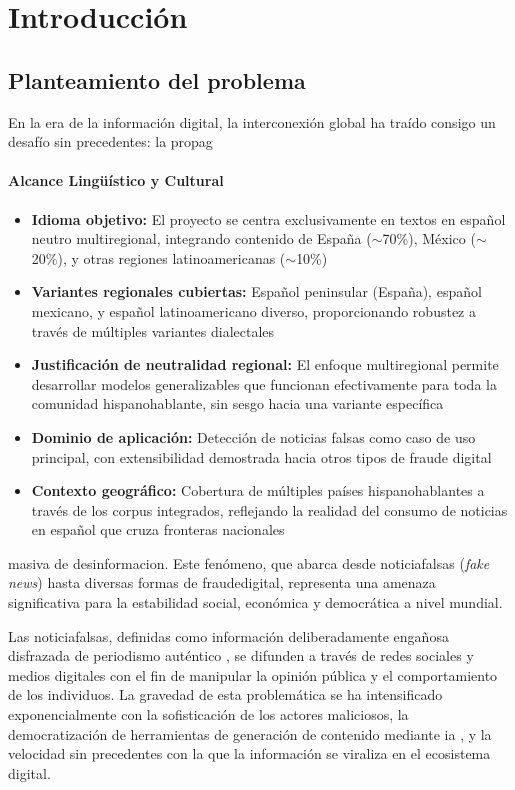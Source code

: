 \chapter{Introducción \label{cap:Introduccion}}

\section{Planteamiento del problema}

En la era de la información digital, la interconexión global ha traído consigo un desafío sin precedentes: la propag\subsubsection{Alcance Lingüístico y Cultural}
\begin{itemize}
    \item \textbf{Idioma objetivo:} El proyecto se centra exclusivamente en textos en español neutro multiregional, integrando contenido de España ($\sim$70\%), México ($\sim$20\%), y otras regiones latinoamericanas ($\sim$10\%)
    \item \textbf{Variantes regionales cubiertas:} Español peninsular (España), español mexicano, y español latinoamericano diverso, proporcionando robustez a través de múltiples variantes dialectales
    \item \textbf{Justificación de neutralidad regional:} El enfoque multiregional permite desarrollar modelos generalizables que funcionan efectivamente para toda la comunidad hispanohablante, sin sesgo hacia una variante específica
    \item \textbf{Dominio de aplicación:} Detección de noticias falsas como caso de uso principal, con extensibilidad demostrada hacia otros tipos de fraude digital
    \item \textbf{Contexto geográfico:} Cobertura de múltiples países hispanohablantes a través de los corpus integrados, reflejando la realidad del consumo de noticias en español que cruza fronteras nacionales
\end{itemize}masiva de \gls{desinformacion}. Este fenómeno, que abarca desde \glspl{noticiafalsa} (\textit{fake news}) hasta diversas formas de \gls{fraudedigital}, representa una amenaza significativa para la estabilidad social, económica y democrática a nivel mundial.

Las \glspl{noticiafalsa}, definidas como información deliberadamente engañosa disfrazada de periodismo auténtico \cite{bondielli2019survey}, se difunden a través de redes sociales y medios digitales con el fin de manipular la opinión pública y el comportamiento de los individuos. La gravedad de esta problemática se ha intensificado exponencialmente con la sofisticación de los actores maliciosos, la democratización de herramientas de generación de contenido mediante \gls{ia} \cite{hu2024bad}, y la velocidad sin precedentes con la que la información se viraliza en el ecosistema digital.

